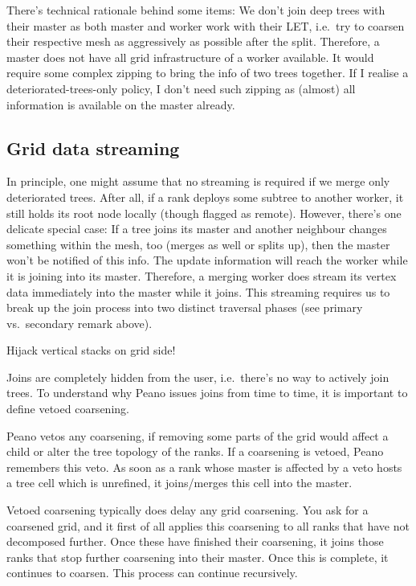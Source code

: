 \noindent
There's technical rationale behind some items:
We don't join deep trees with their master as both master and worker work with
their LET, i.e.~try to coarsen their respective mesh as aggressively as possible
after the split.
Therefore, a master does not have all grid infrastructure of a worker available.
It would require some complex zipping to bring the info of two trees together.
If I realise a deteriorated-trees-only policy, I don't need such zipping as
(almost) all information is available on the master already.



\subsection{Grid data streaming}


In principle, one might assume that no streaming is required if we merge only
deteriorated trees. 
After all, if a rank deploys some subtree to another worker, it still holds its
root node locally (though flagged as remote).
However, there's one delicate special case:
If a tree joins its master and another neighbour changes something within the
mesh, too (merges as well or splits up), then the master won't be notified of
this info.
The update information will reach the worker while it is joining into its
master.
Therefore, a merging worker does stream its vertex data immediately into the
master while it joins.
This streaming requires us to break up the join process into two distinct
traversal phases (see primary vs.~secondary remark above).


Hijack vertical stacks on grid side!



Joins are completely hidden from the user, i.e.~there's no way to actively join
trees. 
To understand why Peano issues joins from time to time, it is important to
define vetoed coarsening.

\begin{definition}
 Peano vetos any coarsening, if removing some parts of the grid would affect a
 child or alter the tree topology of the ranks.
 If a coarsening is vetoed, Peano remembers this veto. 
 As soon as a rank whose master is affected by a veto hosts a tree cell which is
 unrefined, it joins/merges this cell into the master.
\end{definition}

\noindent
Vetoed coarsening typically does delay any grid coarsening.
You ask for a coarsened grid, and it first of all applies this coarsening to all
ranks that have not decomposed further.
Once these have finished their coarsening, it joins those ranks that stop
further coarsening into their master.
Once this is complete, it continues to coarsen.
This process can continue recursively.


